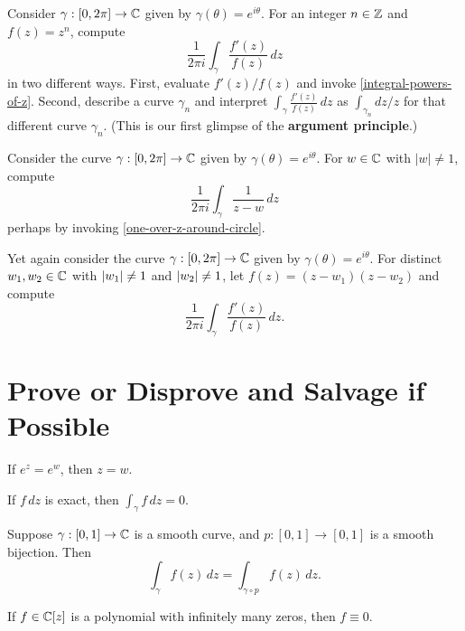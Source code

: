 \documentclass{homework}
\begin{document}
\begin{problem}\label{argument-principle-numerical}Consider $\gamma : [0,2\pi] \to \mathbb{C}$ given by $\gamma(\theta) = e^{i\theta}$.  For an integer $n \in \mathbb{Z}$ and $f(z) = z^n$, compute
  \[
    \frac{1}{2\pi i} \displaystyle\int_\gamma \frac{f'(z)}{f(z)} \, dz
  \]
  in two different ways.  First, evaluate $f'(z)/f(z)$ and invoke
  \ref{integral-powers-of-z}.  Second, describe a curve $\gamma_n$ and
  interpret $\int_\gamma \frac{f'(z)}{f(z)} \, dz$ as
  $\int_{\gamma_n} dz/z$ for that different curve $\gamma_n$.  (This
  is our first glimpse of the \textbf{argument principle}.)
\end{problem}

\begin{problem}
  Consider the curve $\gamma : [0,2\pi] \to \mathbb{C}$ given by $\gamma(\theta) = e^{i\theta}$.  For $w \in \mathbb{C}$ with $|w| \neq 1$, compute
  \[
    \frac{1}{2\pi i} \displaystyle\int_\gamma \frac{1}{z-w} \, dz
  \]
  perhaps by invoking \ref{one-over-z-around-circle}.
\end{problem}

\begin{problem}
  Yet again consider the curve $\gamma : [0,2\pi] \to \mathbb{C}$ given by $\gamma(\theta) = e^{i\theta}$.  For distinct $w_1, w_2 \in \mathbb{C}$ with $\left|w_1\right| \neq 1$ and $\left|w_2\right| \neq 1$, let $f(z) = (z - w_1) (z - w_2)$ and compute
  \[
    \frac{1}{2\pi i} \displaystyle\int_\gamma \frac{f'(z)}{f(z)} \, dz.
  \]
\end{problem}

\section{Prove or Disprove and Salvage if Possible}

\begin{problem}
  If $e^z = e^w$, then $z = w$.
\end{problem}

\begin{problem}
  If $f \, dz$ is exact, then $\displaystyle\int_\gamma f \, dz = 0$.
\end{problem}

\begin{problem}%
  Suppose $\gamma : [0,1] \to \mathbb{C}$ is a smooth curve, and $p : [0,1] \to [0,1]$ is a smooth bijection.
  Then
  \[
    \int_\gamma f(z) \, dz = \int_{\gamma \circ p} f(z) \, dz.
  \]
\end{problem}

  \begin{problem}\label{identity-theorem}If $f \in \mathbb{C}[z]$ is a polynomial with infinitely many zeros, then
    $f \equiv 0$.
  \end{problem}
  
\end{document}
